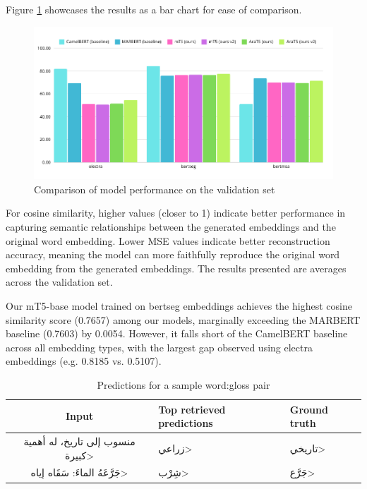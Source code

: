 \documentclass[12.5pt]{article}
\begin{document}
Figure \ref{fig:results-chart} showcases the results as a bar chart for ease of comparison.

\begin{figure}[H]
    \centering
    \captionsetup{justification=centering}
    \includegraphics[width=1\textwidth]{results-chart.png}
    \caption{Comparison of model performance on the validation set}
    \label{fig:results-chart}
\end{figure}

For cosine similarity, higher values (closer to 1) indicate better performance in capturing semantic relationships between the generated embeddings and the original word embedding. Lower MSE values indicate better reconstruction accuracy, meaning the model can more faithfully reproduce the original word embedding from the generated embeddings. The results presented are averages across the validation set.

Our mT5-base model trained on bertseg embeddings achieves the highest cosine similarity score (0.7657) among our models, marginally exceeding the MARBERT baseline (0.7603) by 0.0054. However, it falls short of the CamelBERT baseline across all embedding types, with the largest gap observed using electra embeddings (e.g. 0.8185 vs. 0.5107).

\begin{table}[H]
    \centering
    \caption{Predictions for a sample word:gloss pair}
    \label{table:results-sample}
    \renewcommand{\arraystretch}{1.5}%
    \begin{tabularx}{\textwidth}{|c|X|X|}
        \hline
        \textbf{Input} & \textbf{Top retrieved predictions} & \textbf{Ground truth} \\
        \hline
        \<منسوب إلى تاريخ، له أهمية كبيرة> & \<زراعي> & \<تاريخي> \\
        \hline
        \<جَرَّعَهُ الماءَ: سَقَاه إياه> & \<شِرْب> & \<جَرَّع> \\
        \hline
    \end{tabularx}
\end{table}
\end{document}
